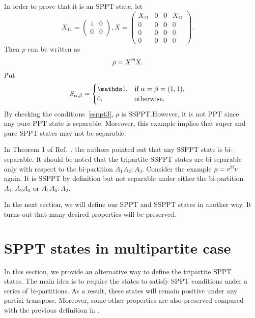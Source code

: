 In order to prove that  it is  an SPPT state, let 
\begin{equation}
  \label{multiSPPTv0.6:eq:14}
  X_{11} =
  \begin{pmatrix}
    1&0\\
    0&0
  \end{pmatrix},
  X =
  \begin{pmatrix}
    X_{11} & 0 & 0 & X_{11}\\
    0&0&0&0\\
    0&0&0&0\\
    0&0&0&0
  \end{pmatrix}.
\end{equation}
Then $\rho$ can be written as
\begin{equation}
  \label{multiSPPTv0.6:eq:15}
  \rho = X^{\mathsf{H}} X.
\end{equation}
Put
\begin{equation}
  \label{multiSPPTv0.6:eq:16}
  S_{\alpha,\beta} =
  \begin{cases}
    \I , &\text{if } \alpha=\beta = (1,1),\\
    0,&\text{otherwise}.
  \end{cases}
\end{equation}
By checking the conditions~\eqref{ssppt3}, $\rho$ is SSPPT.\@ However, it is not PPT since any pure PPT state is separable. Moreover, this example 
implies that  super and pure SPPT states may not be separable.




In  Theorem 1 of Ref.~\cite{SPPT3partite}, the authors pointed out that any SSPPT state is bi-separable.
It should be noted  that the  tripartite SSPPT states are bi-separable only with respect
to  the  bi-partition $A_1A_2:A_3$. Consider the example $\rho = v^{\mathsf{H}}
v$ again. It is  SSPPT by definition but  not separable under either the  bi-partition  $A_1:A_2A_3$ or $A_1A_3:A_2$.

In the next section, we will define our SPPT
and SSPPT states in another way. It turns out  that  many desired properties will be preserved. 

\section{SPPT states in  multipartite case}%
\label{sec:mySPPT}%
In this section, we provide an alternative way to define the tripartite SPPT states.  
The main idea is to require the states to satisfy   SPPT conditions  under a series of bi-partitions. As a result, these
states will remain positive under any partial transpose. 
Moreover, some other properties are also preserved compared with the previous definition in \cite{SPPT3partite}.

